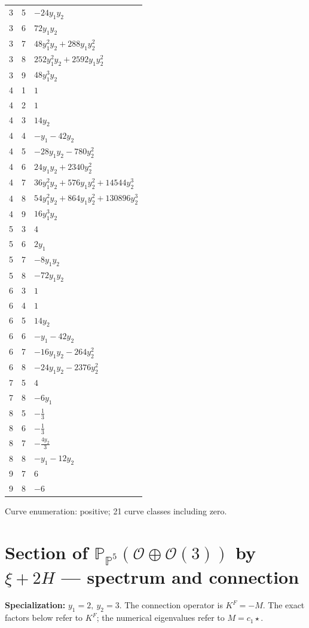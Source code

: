 \documentclass[10pt,a4paper]{article}
\begin{document}
{\begin{longtable}{rrp{125mm}}
3 & 5 & $- 24 y_{1} y_{2}$\\
3 & 6 & $72 y_{1} y_{2}$\\
3 & 7 & $48 y_{1}^{2} y_{2} + 288 y_{1} y_{2}^{2}$\\
3 & 8 & $252 y_{1}^{2} y_{2} + 2592 y_{1} y_{2}^{2}$\\
3 & 9 & $48 y_{1}^{3} y_{2}$\\
4 & 1 & $1$\\
4 & 2 & $1$\\
4 & 3 & $14 y_{2}$\\
4 & 4 & $- y_{1} - 42 y_{2}$\\
4 & 5 & $- 28 y_{1} y_{2} - 780 y_{2}^{2}$\\
4 & 6 & $24 y_{1} y_{2} + 2340 y_{2}^{2}$\\
4 & 7 & $36 y_{1}^{2} y_{2} + 576 y_{1} y_{2}^{2} + 14544 y_{2}^{3}$\\
4 & 8 & $54 y_{1}^{2} y_{2} + 864 y_{1} y_{2}^{2} + 130896 y_{2}^{3}$\\
4 & 9 & $16 y_{1}^{3} y_{2}$\\
5 & 3 & $4$\\
5 & 6 & $2 y_{1}$\\
5 & 7 & $- 8 y_{1} y_{2}$\\
5 & 8 & $- 72 y_{1} y_{2}$\\
6 & 3 & $1$\\
6 & 4 & $1$\\
6 & 5 & $14 y_{2}$\\
6 & 6 & $- y_{1} - 42 y_{2}$\\
6 & 7 & $- 16 y_{1} y_{2} - 264 y_{2}^{2}$\\
6 & 8 & $- 24 y_{1} y_{2} - 2376 y_{2}^{2}$\\
7 & 5 & $4$\\
7 & 8 & $- 6 y_{1}$\\
8 & 5 & $- \frac{1}{3}$\\
8 & 6 & $- \frac{1}{3}$\\
8 & 7 & $- \frac{4 y_{2}}{3}$\\
8 & 8 & $- y_{1} - 12 y_{2}$\\
9 & 7 & $6$\\
9 & 8 & $-6$\\
\end{longtable}}
Curve enumeration: positive; 21 curve classes including zero.
\clearpage\section*{Section of $\mathbb P_{\mathbb P^{5}}(\mathcal O\oplus \mathcal O(3))$ by $\xi +2H$ --- spectrum and connection}
\textbf{Specialization:} $y_1=2,\ y_2=3$. The connection operator is $K^F=-M$. The exact factors below refer to $K^F$; the numerical eigenvalues refer to $M=c_1\star$.
\end{document}
